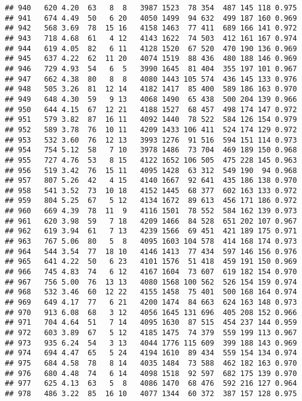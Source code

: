\documentclass[]{article}
\begin{document}
\begin{verbatim}
## 940   620 4.20  63   8  8   3987 1523  78 354  487 145 118 0.975
## 941   674 4.49  50   6 20   4050 1499  94 632  499 187 160 0.969
## 942   568 3.69  78  15 16   4158 1463  77 411  689 166 141 0.972
## 943   718 4.68  61   4 12   4143 1622  74 503  412 161 167 0.974
## 944   619 4.05  82   6 11   4128 1520  67 520  470 190 136 0.969
## 945   637 4.22  62  11 20   4074 1519  88 436  480 188 146 0.969
## 946   729 4.93  54   6  5   3990 1645  81 404  355 197 101 0.967
## 947   662 4.38  80   8  8   4080 1443 105 574  436 145 133 0.976
## 948   505 3.26  81  12 14   4182 1417  85 400  589 186 163 0.970
## 949   648 4.30  59   9 13   4068 1490  65 438  500 204 139 0.966
## 950   644 4.15  67  12 21   4188 1527  68 457  498 174 147 0.972
## 951   579 3.82  87  16 11   4092 1440  78 522  584 126 154 0.979
## 952   589 3.78  76  10 11   4209 1433 106 411  524 174 129 0.972
## 953   532 3.60  76  12 13   3993 1276  91 516  594 151 114 0.973
## 954   754 5.12  58   7 10   3978 1486  73 704  469 189 150 0.968
## 955   727 4.76  53   8 15   4122 1652 106 505  475 228 145 0.963
## 956   519 3.42  76  15 11   4095 1428  63 312  549 190  94 0.968
## 957   807 5.26  42   4 15   4140 1667  92 641  435 186 138 0.970
## 958   541 3.52  73  10 18   4152 1445  68 377  602 163 133 0.972
## 959   804 5.25  67   5 12   4134 1672  89 613  456 171 186 0.972
## 960   669 4.39  78  11  9   4116 1501  78 552  584 162 139 0.973
## 961   620 3.98  59   7 18   4209 1466  84 528  651 202 107 0.967
## 962   619 3.94  61   7 13   4239 1566  69 451  421 189 175 0.971
## 963   767 5.06  80   5  8   4095 1603 104 578  414 168 174 0.973
## 964   544 3.54  77  18 10   4146 1413  77 434  597 146 156 0.976
## 965   641 4.22  50   6 23   4101 1576  51 418  459 191 150 0.969
## 966   745 4.83  74   6 12   4167 1604  73 607  619 182 154 0.970
## 967   756 5.00  76  13 13   4080 1568 100 562  526 154 159 0.974
## 968   532 3.46  60  12 22   4155 1458  75 401  500 168 164 0.974
## 969   649 4.17  77   6 21   4200 1474  84 663  624 163 148 0.973
## 970   913 6.08  68   3 12   4056 1645 131 696  405 208 152 0.966
## 971   704 4.64  51   7 14   4095 1630  87 515  454 237 144 0.959
## 972   603 3.89  67   5 12   4185 1475  74 379  559 199 113 0.967
## 973   935 6.24  54   3 13   4044 1776 115 609  399 188 143 0.969
## 974   694 4.47  65   5 24   4194 1610  89 434  559 154 134 0.974
## 975   684 4.58  78   8 14   4035 1484  73 588  462 182 163 0.970
## 976   680 4.48  74   6 14   4098 1518  92 597  682 175 139 0.970
## 977   625 4.13  63   5  8   4086 1470  68 476  592 216 127 0.964
## 978   486 3.22  85  16 10   4077 1344  60 372  387 157 128 0.975

\end{verbatim}
\end{document}

